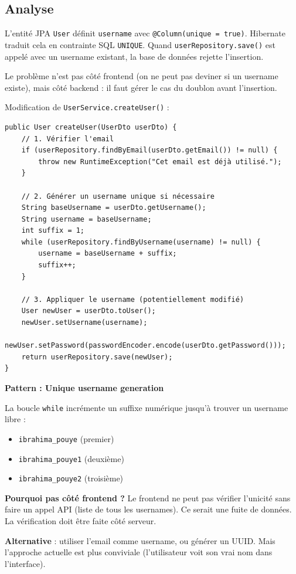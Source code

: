 \documentclass[a4paper,12pt,french]{article}
\begin{document}
\subsection{Analyse}

L'entité JPA \texttt{User} définit \texttt{username} avec \texttt{@Column(unique = true)}. Hibernate traduit cela en contrainte SQL \texttt{UNIQUE}. Quand \texttt{userRepository.save()} est appelé avec un username existant, la base de données rejette l'insertion.

Le problème n'est pas côté frontend (on ne peut pas deviner si un username existe), mais côté backend : il faut gérer le cas du doublon avant l'insertion.

\begin{solutionbox}
Modification de \texttt{UserService.createUser()} :

\begin{lstlisting}[style=javastyle]
public User createUser(UserDto userDto) {
    // 1. Vérifier l'email
    if (userRepository.findByEmail(userDto.getEmail()) != null) {
        throw new RuntimeException("Cet email est déjà utilisé.");
    }
    
    // 2. Générer un username unique si nécessaire
    String baseUsername = userDto.getUsername();
    String username = baseUsername;
    int suffix = 1;
    while (userRepository.findByUsername(username) != null) {
        username = baseUsername + suffix;
        suffix++;
    }
    
    // 3. Appliquer le username (potentiellement modifié)
    User newUser = userDto.toUser();
    newUser.setUsername(username);
    newUser.setPassword(passwordEncoder.encode(userDto.getPassword()));
    return userRepository.save(newUser);
}
\end{lstlisting}
\end{solutionbox}

\begin{lessonbox}
\textbf{Pattern : Unique username generation}

La boucle \texttt{while} incrémente un suffixe numérique jusqu'à trouver un username libre :
\begin{itemize}
    \item \texttt{ibrahima\_pouye} (premier)
    \item \texttt{ibrahima\_pouye1} (deuxième)
    \item \texttt{ibrahima\_pouye2} (troisième)
\end{itemize}

\textbf{Pourquoi pas côté frontend ?} Le frontend ne peut pas vérifier l'unicité sans faire un appel API (liste de tous les usernames). Ce serait une fuite de données. La vérification doit être faite côté serveur.

\textbf{Alternative} : utiliser l'email comme username, ou générer un UUID. Mais l'approche actuelle est plus conviviale (l'utilisateur voit son vrai nom dans l'interface).
\end{lessonbox}
\end{document}
